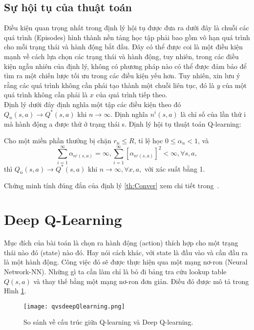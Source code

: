 \subsection{Sự hội tụ của thuật toán}
Điều kiện quan trọng nhất trong định lý hội tụ được đưa ra dưới đây là chuỗi các quá trình (Episodes) hình thành nền tảng học tập phải 
bao gồm vô hạn quá trình cho mỗi trạng thái và hành động bắt đầu. Đây có thể được coi là một điều kiện mạnh về cách lựa chọn các 
trạng thái và hành động, tuy nhiên, trong các điều kiện ngẫu nhiên của định lý, không có phương pháp nào có thể được đảm bảo 
để tìm ra một chiến lược tối ưu trong các điều kiện yếu hơn. Tuy nhiên, xin lưu ý rằng các quá trình không cần phải tạo thành một 
chuỗi liên tục, đó là $y$ của một quá trình không cần phải là $x$ của quá trình tiếp theo.\\
\indent Định lý dưới đây định nghĩa một tập các điều kiện theo đó $Q_n(s,a) \to Q^{*}(s,a)$ khi $n \to \infty$. 
Định nghĩa $n^{i}(s, a)$ là chỉ số của lần thứ i mà hành động a được thử ở trạng thái s.
Định lý hội tụ thuật toán Q-learning:
\begin{theorem}
    \label{th:Conver}
    Cho một miền phần thưởng bị chặn $r_n \leq R$, tỉ lệ học $0 \leq \alpha_n < 1$, và
    \begin{equation}
        \sum_{i=1}^{\infty}\alpha_{n^{i}(s,a)} = \infty, \sum_{i=1}^{\infty}[\alpha_{n^{i}(s,a)}]^2 < \infty, \forall s, a,
    \end{equation} 
    thì $Q_n(s,a) \to Q^{*}(s,a)$ khi $n \to \infty, \forall x, a,$ với xác suất bằng 1.
\end{theorem}
Chứng minh tính đúng đắn của định lý \ref{th:Conver} xem chi tiết trong~\cite{Watkins1992}.
\section{Deep Q-Learning}
Mục đích của bài toán là chọn ra hành động (action) thích hợp cho một trạng thái nào đó (state) 
nào đó. Hay nói cách khác, với state là đầu vào và cần đầu ra là một hành động. 
Công việc đó sẽ được thực hiện qua một mạng nơ-ron (Neural Network-NN). Những gì ta cần làm 
chỉ là bỏ đi  bảng tra cứu lookup table $Q(s,a)$ và thay thế bằng một mạng nơ-ron đơn giản. 
Điều đó được mô tả trong Hình \ref{fig:qlearning}.
\begin{figure}[ht]
    \centering
    \texttt{[image: qvsdeepQlearning.png]}
    \caption{So sánh về cấu trúc giữa Q-learning và Deep Q-learning.}
    \label{fig:qlearning}
\end{figure}
